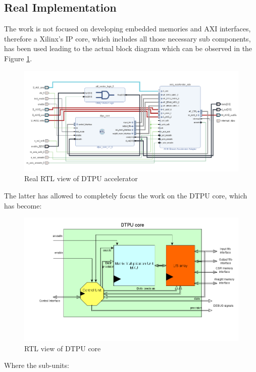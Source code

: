 \subsection{Real Implementation}
The work is not focused on developing embedded memories and AXI interfaces, therefore a Xilinx's IP core, which includes all those necessary sub components, has been used \cite{paper:43} leading to the actual block diagram which can be observed in the Figure \ref{fig:rtlaccel}.
\begin{figure}[H]
\centering
\captionsetup{justification=centering}
\includegraphics[scale=0.8,angle=0]{./figure/accelerator_schematic.png}
\caption{Real RTL view of DTPU accelerator}
\label{fig:rtlaccel}
\end{figure} 
The latter has allowed to completely focus the work on the DTPU core, which has become:
\begin{figure}[H]
\centering
\captionsetup{justification=centering}
\includegraphics[scale=0.45,angle=0]{./figure/dtpu_core.png}
\caption{RTL view of DTPU core}
\label{fig:dtpucore}
\end{figure} 
Where the sub-units:
